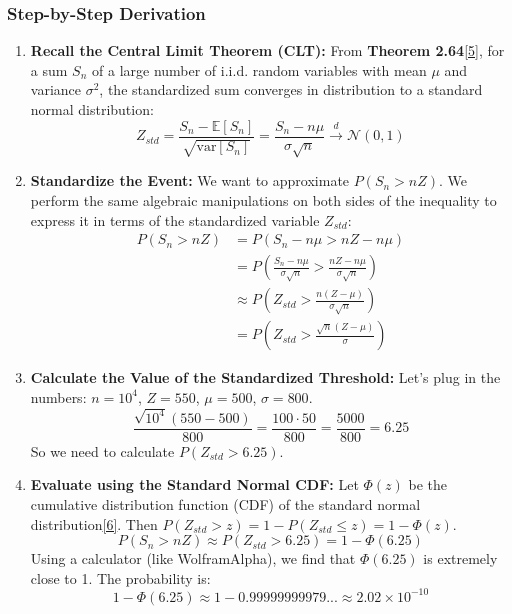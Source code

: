 \documentclass[11pt,a4paper]{article}
\begin{document}
\subsubsection{Step-by-Step Derivation}
\begin{enumerate}
    \item \textbf{Recall the Central Limit Theorem (CLT):} From \textbf{Theorem 2.64}\hyperlink{note5}{[5]}, for a sum $S_n$ of a large number of i.i.d. random variables with mean $\mu$ and variance $\sigma^2$, the standardized sum converges in distribution to a standard normal distribution:
    \[ Z_{std} = \frac{S_n - \mathbb{E}[S_n]}{\sqrt{\text{var}[S_n]}} = \frac{S_n - n\mu}{\sigma\sqrt{n}} \xrightarrow{d} \mathcal{N}(0, 1) \]

    \item \textbf{Standardize the Event:} We want to approximate $P(S_n > nZ)$. We perform the same algebraic manipulations on both sides of the inequality to express it in terms of the standardized variable $Z_{std}$:
    \begin{align*}
        P(S_n > nZ) &= P(S_n - n\mu > nZ - n\mu) \\
        &= P\left(\frac{S_n - n\mu}{\sigma\sqrt{n}} > \frac{nZ - n\mu}{\sigma\sqrt{n}}\right) \\
        &\approx P\left(Z_{std} > \frac{n(Z - \mu)}{\sigma\sqrt{n}}\right) \\
        &= P\left(Z_{std} > \frac{\sqrt{n}(Z - \mu)}{\sigma}\right)
    \end{align*}

    \item \textbf{Calculate the Value of the Standardized Threshold:}
    Let's plug in the numbers: $n=10^4$, $Z=550$, $\mu=500$, $\sigma=800$.
    \[ \frac{\sqrt{10^4}(550 - 500)}{800} = \frac{100 \cdot 50}{800} = \frac{5000}{800} = 6.25 \]
    So we need to calculate $P(Z_{std} > 6.25)$.

    \item \textbf{Evaluate using the Standard Normal CDF:} Let $\Phi(z)$ be the cumulative distribution function (CDF) of the standard normal distribution\hyperlink{note6}{[6]}. Then $P(Z_{std} > z) = 1 - P(Z_{std} \le z) = 1 - \Phi(z)$.
    \[ P(S_n > nZ) \approx P(Z_{std} > 6.25) = 1 - \Phi(6.25) \]
    Using a calculator (like WolframAlpha), we find that $\Phi(6.25)$ is extremely close to 1. The probability is:
    \[ 1 - \Phi(6.25) \approx 1 - 0.99999999979... \approx 2.02 \times 10^{-10} \]
\end{enumerate}
\end{document}

